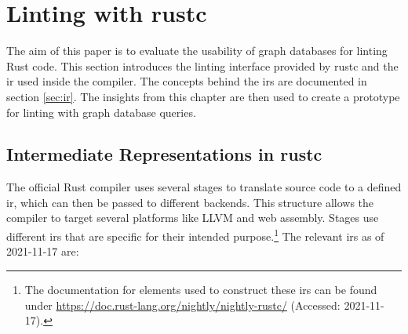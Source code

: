 \section{Linting with rustc} \label{sec:plan}

The aim of this paper is to evaluate the usability of graph databases for linting Rust code. This section introduces the linting interface provided by rustc and the \acrlong{ir} used inside the compiler. The concepts behind the \acrshort{ir}s are documented in section \ref{sec:ir}. The insights from this chapter are then used to create a prototype for linting with graph database queries.

\subsection{Intermediate Representations in rustc} \label{sec:plan.rir}

The official Rust compiler uses several stages to translate source code to a defined \acrshort{ir}, which can then be passed to different backends. This structure allows the compiler to target several platforms like LLVM and web assembly. Stages use different \acrshort{ir}s that are specific for their intended purpose.\footnote{The documentation for elements used to construct these \acrlong{ir}s can be found under \url{https://doc.rust-lang.org/nightly/nightly-rustc/} (Accessed: 2021-11-17).} The relevant \acrshort{ir}s as of 2021-11-17 are:

